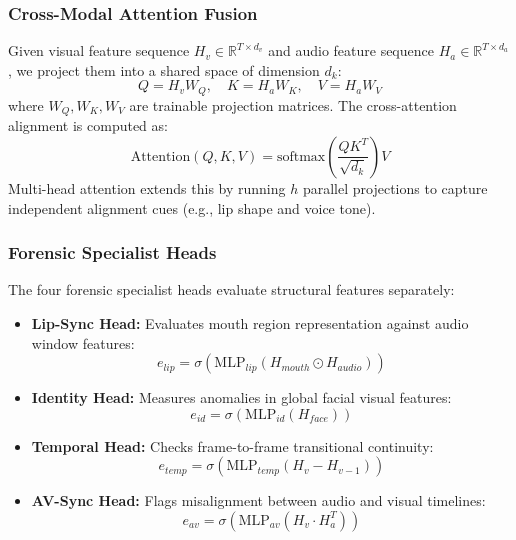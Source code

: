 \documentclass[conference]{IEEEtran}
\begin{document}
\subsubsection{Cross-Modal Attention Fusion}
Given visual feature sequence $H_v \in \mathbb{R}^{T \times d_v}$ and audio feature sequence $H_a \in \mathbb{R}^{T \times d_a}$, we project them into a shared space of dimension $d_k$:
\begin{equation}
Q = H_v W_Q, \quad K = H_a W_K, \quad V = H_a W_V
\end{equation}
where $W_Q, W_K, W_V$ are trainable projection matrices. The cross-attention alignment is computed as:
\begin{equation}
\text{Attention}(Q, K, V) = \text{softmax}\left(\frac{Q K^T}{\sqrt{d_k}}\right) V
\end{equation}
Multi-head attention extends this by running $h$ parallel projections to capture independent alignment cues (e.g., lip shape and voice tone).

\subsubsection{Forensic Specialist Heads}
The four forensic specialist heads evaluate structural features separately:
\begin{itemize}
\item \textbf{Lip-Sync Head:} Evaluates mouth region representation against audio window features:
\begin{equation}
e_{lip} = \sigma\left(\text{MLP}_{lip}(H_{mouth} \odot H_{audio})\right)
\end{equation}
\item \textbf{Identity Head:} Measures anomalies in global facial visual features:
\begin{equation}
e_{id} = \sigma\left(\text{MLP}_{id}(H_{face})\right)
\end{equation}
\item \textbf{Temporal Head:} Checks frame-to-frame transitional continuity:
\begin{equation}
e_{temp} = \sigma\left(\text{MLP}_{temp}(H_v - H_{v-1})\right)
\end{equation}
\item \textbf{AV-Sync Head:} Flags misalignment between audio and visual timelines:
\begin{equation}
e_{av} = \sigma\left(\text{MLP}_{av}(H_v \cdot H_a^T)\right)
\end{equation}
\end{itemize}
\end{document}
